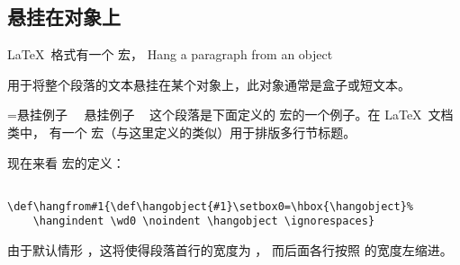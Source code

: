\documentclass{book}
\begin{document}
\subsection{悬挂在对象上}

\LaTeX\ 格式有一个  宏，
\howto Hang a paragraph from an object\par
用于将整个段落的文本悬挂在某个对象上，此对象通常是盒子或短文本。

\begingroup
\medskip
\def\hangobject{悬挂例子 \ }
=\hbox{\hangobject}
\hangindent {} \noindent \hangobject
这个段落是下面定义的  宏的一个例子。在 \LaTeX\ 文档类中，
有一个  宏（与这里定义的类似）用于排版多行节标题。\par
\endgroup

% 
现在来看  宏的定义：
\begin{verbatim}
 
\def\hangfrom#1{\def\hangobject{#1}\setbox0=\hbox{\hangobject}%
    \hangindent \wd0 \noindent \hangobject \ignorespaces}
\end{verbatim}
由于默认情形 ，这将使得段落首行的宽度为 ，
而后面各行按照  的宽度左缩进。
\end{document}
